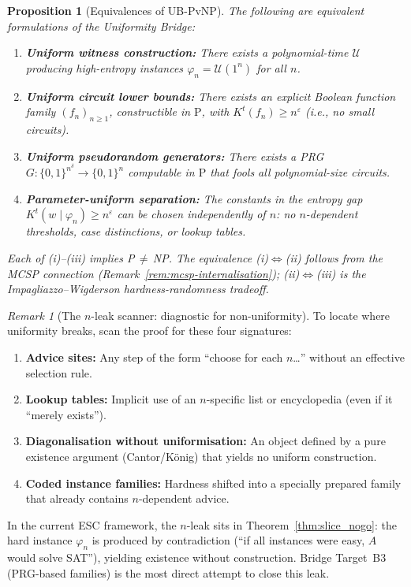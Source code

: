 \documentclass[aps,prd,twocolumn,superscriptaddress,nofootinbib]{revtex4-2}
\newtheorem{proposition}[theorem]{Proposition}
\theoremstyle{definition}
\theoremstyle{remark}
\newtheorem{remark}[theorem]{Remark}
\begin{document}
\begin{proposition}[Equivalences of UB-PvNP]\label{prop:ub-equivalences}
The following are equivalent formulations of the Uniformity Bridge:
\begin{enumerate}
\item[(i)] \textbf{Uniform witness construction:} There exists a polynomial-time $\mathcal{U}$ producing high-entropy instances $\varphi_n = \mathcal{U}(1^n)$ for all $n$.
\item[(ii)] \textbf{Uniform circuit lower bounds:} There exists an explicit Boolean function family $(f_n)_{n \geq 1}$, constructible in $\mathrm{P}$, with $K^t(f_n) \geq n^\varepsilon$ (i.e., no small circuits).
\item[(iii)] \textbf{Uniform pseudorandom generators:} There exists a PRG $G: \{0,1\}^{n^\delta} \to \{0,1\}^n$ computable in $\mathrm{P}$ that fools all polynomial-size circuits.
\item[(iv)] \textbf{Parameter-uniform separation:} The constants in the entropy gap $K^t(w \mid \varphi_n) \geq n^\varepsilon$ can be chosen \emph{independently} of $n$: no $n$-dependent thresholds, case distinctions, or lookup tables.
\end{enumerate}
Each of (i)--(iii) implies P$\,\neq\,$NP. The equivalence (i)$\Leftrightarrow$(ii) follows from the MCSP connection (Remark~\ref{rem:mcsp-internalisation}); (ii)$\Leftrightarrow$(iii) is the Impagliazzo--Wigderson hardness-randomness tradeoff.
\end{proposition}

\begin{remark}[The $n$-leak scanner: diagnostic for non-uniformity]\label{rem:n-leak}
To locate where uniformity breaks, scan the proof for these four signatures:
\begin{enumerate}
\item \textbf{Advice sites:} Any step of the form ``choose for each $n$\ldots'' without an effective selection rule.
\item \textbf{Lookup tables:} Implicit use of an $n$-specific list or encyclopedia (even if it ``merely exists'').
\item \textbf{Diagonalisation without uniformisation:} An object defined by a pure existence argument (Cantor/K\"onig) that yields no uniform construction.
\item \textbf{Coded instance families:} Hardness shifted into a specially prepared family that already contains $n$-dependent advice.
\end{enumerate}
In the current ESC framework, the $n$-leak sits in Theorem~\ref{thm:slice_nogo}: the hard instance $\varphi_n$ is produced by contradiction (``if all instances were easy, $A$ would solve SAT''), yielding existence without construction. Bridge Target~B3 (PRG-based families) is the most direct attempt to close this leak.
\end{remark}
\end{document}
